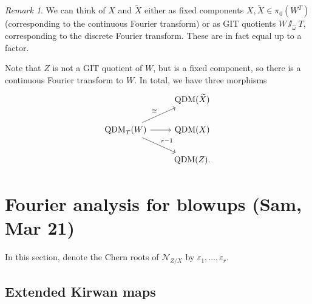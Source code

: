 \documentclass[leqno, openany]{memoir}
\theoremstyle{definition}
\theoremstyle{remark}
\newtheorem{rmk}[thm]{Remark}
\theoremstyle{plain}
\theoremstyle{definition}
\theoremstyle{remark}
\newcommand{\ep}{\varepsilon}
\newcommand{\mc}[1]{\mathcal{#1}}
\newcommand{\wt}[1]{\widetilde{#1}}
\newcommand{\wh}[1]{\widehat{#1}}
\DeclareMathOperator{\QDM}{QDM}
\begin{document}
\begin{rmk}
    We can think of $X$ and $\wt{X}$ either as fixed components $X, \wt{X} \in \pi_0(W^T)$ (corresponding to the continuous Fourier transform) or as GIT quotients $W \sslash_{\wh{\omega}} T$, corresponding to the discrete Fourier transform. These are in fact equal up to a factor.

    Note that $Z$ is not a GIT quotient of $W$, but is a fixed component, so there is a continuous Fourier transform to $W$. In total, we have three morphisms
    \begin{equation*}
    \begin{tikzcd}
        & \QDM(\wt{X}) \\
        \QDM_T(W) \ar{ur}{\cong} \ar{r} \ar{dr}{r-1} & \QDM(X) \\
        & \QDM(Z).
    \end{tikzcd}
    \end{equation*}
\end{rmk}

\section{Fourier analysis for blowups (Sam, Mar 21)}%
\label{sec:Fourier analysis for blowups}

In this section, denote the Chern roots of $\mc{N}_{Z/X}$ by $\ep_1, \ldots, \ep_r$. 

\subsection{Extended Kirwan maps}%
\label{sub:Extended Kirwan maps}
\end{document}

